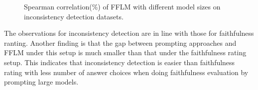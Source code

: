 \begin{figure}[th]
	\centering
	\begin{minipage}[t]{\linewidth}
		\centering
	\end{minipage}%
	
	\caption{Spearman correlation(\%) of FFLM with different model sizes on inconsistency detection datasets.}
	\label{fig:sizes-id}
\end{figure}


The observations for inconsistency detection are in line with those for faithfulness ranting. Another finding is that the gap between prompting approaches and FFLM under this setup is much smaller than that under the faithfulness rating setup.
This indicates that inconsistency detection is easier than faithfulness rating with less number of answer choices when doing faithfulness evaluation by prompting large models.








